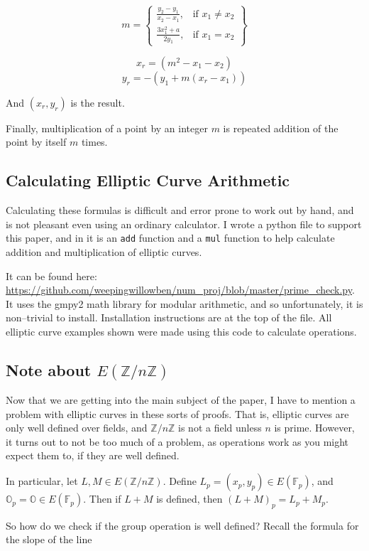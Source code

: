 \documentclass[]{article}
\newcommand{\Z}{\mathbb{Z}}
\newcommand{\OS}{\mathbb{O}}
\newcommand{\ZMZ}[1]{\Z/#1\Z}
\newcommand{\F}{\mathbb{F}}
\begin{document}
\[
m = \left\{\begin{array}{lr}
\frac{y_2-y_1}{x_2-x_1}, & \text{if } x_1 \ne x_2 \\
\frac{3x_1^2+a}{2y_1}, & \text{if } x_1 = x_2
\end{array}\right\}
\]

$$x_r = (m^2-x_1 - x_2)$$
$$y_r = -(y_1 + m(x_r - x_1))$$

\noindent And $(x_r,y_r)$ is the result.

Finally, multiplication of a point by an integer $m$ is repeated addition of the point by itself $m$ times. 

\subsection{Calculating Elliptic Curve Arithmetic}

Calculating these formulas is difficult and error prone to work out by hand, and is not pleasant even using an ordinary calculator. I wrote a python file to support this paper, and in it is an \texttt{add} function and a \texttt{mul} function to help calculate addition and multiplication of elliptic curves.

It can be found here: \url{https://github.com/weepingwillowben/num_proj/blob/master/prime_check.py}. 
It uses the gmpy2 math library for modular arithmetic, and so unfortunately, it is non--trivial to install. Installation instructions are at the top of the file. All elliptic curve examples shown were made using this code to calculate operations.

\subsection{Note about $E(\ZMZ{n})$}

Now that we are getting into the main subject of the paper, I have to mention a problem with elliptic curves in these sorts of proofs. That is, elliptic curves are only well defined over fields, and $\ZMZ{n}$ is not a field unless $n$ is prime. However, it turns out to not be too much of a problem, as operations work as you might expect them to, if they are well defined.

In particular, let $L,M \in E(\ZMZ{n})$. Define $L_p = (x_p,y_p) \in E(\F_p)$, and $\OS_p = \OS \in E(\F_p)$. Then if $L+M$ is defined, then $(L+M)_p = L_p + M_p$.

So how do we check if the group operation is well defined? Recall the formula for the slope of the line
\end{document}
